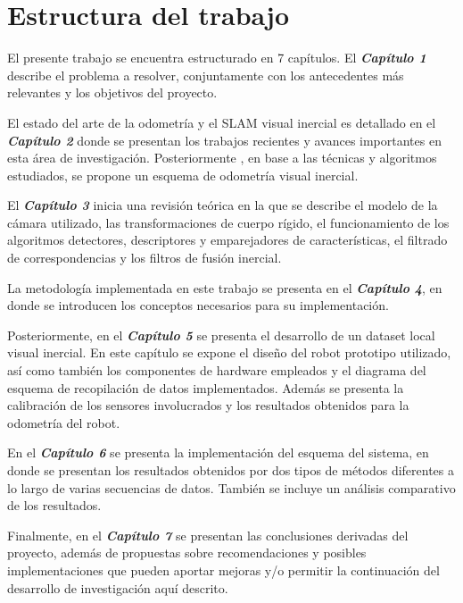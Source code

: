 \section{Estructura del trabajo}

El presente trabajo se encuentra estructurado en 7 capítulos. El \textit{\textbf{Capítulo 1}} describe el problema a resolver, conjuntamente con los antecedentes más relevantes y los objetivos del proyecto.

El estado del arte de la odometría y el SLAM visual inercial es detallado en el \textit{\textbf{Capítulo 2}} donde se presentan los trabajos recientes y avances importantes en esta área de investigación. Posteriormente , en base a las técnicas y algoritmos estudiados, se propone un esquema de odometría visual inercial.


El \textit{\textbf{Capítulo 3}} inicia una revisión teórica en la que se describe el modelo de la cámara utilizado, las transformaciones de cuerpo rígido, 
el funcionamiento de los algoritmos detectores, descriptores y emparejadores de características, el filtrado de correspondencias y los filtros de fusión inercial.

La metodología implementada en este trabajo se presenta en el \textit{\textbf{Capítulo 4}}, en donde se introducen los conceptos necesarios para su implementación.

Posteriormente, en el \textit{\textbf{Capítulo 5}} se presenta el desarrollo de un dataset local visual inercial. En este capítulo se expone el diseño del robot prototipo utilizado, así como también los componentes de hardware empleados y el diagrama del esquema de recopilación de datos implementados. Además se presenta la calibración de los sensores involucrados y los resultados obtenidos para la odometría del robot.

En el \textit{\textbf{Capítulo 6}} se presenta la implementación del esquema del sistema, en donde se presentan los resultados obtenidos por dos tipos de métodos diferentes a lo largo de varias secuencias de datos. También se incluye un análisis comparativo de los resultados.


Finalmente, en el \textit{\textbf{Capítulo 7}} se presentan las conclusiones derivadas del proyecto, además de propuestas sobre recomendaciones y posibles implementaciones que pueden aportar mejoras y/o permitir la continuación del desarrollo de investigación aquí descrito.
